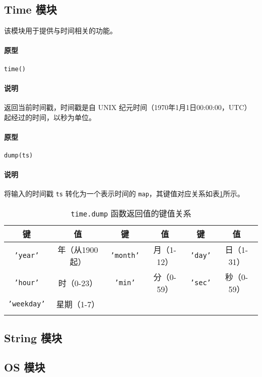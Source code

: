 \subsection{Time 模块}

该模块用于提供与时间相关的功能。


\paragraph{原型}
\begin{lstlisting}[language=berry, numbers=none]
time()
\end{lstlisting}

\paragraph{说明}
返回当前时间戳，时间戳是自 UNIX 纪元时间（1970年1月1日00:00:00，UTC）起经过的时间，以秒为单位。


\paragraph{原型}
\begin{lstlisting}[language=berry, numbers=none]
dump(ts)
\end{lstlisting}

\paragraph{说明}
将输入的时间戳 \texttt{ts} 转化为一个表示时间的 \texttt{map}，其键值对应关系如表\ref{tab::time_dump_map}所示。
\begin{table}[htb]
    \centering
    \setlength{\tabcolsep}{2mm}
    \begin{tabular}{cccccc} \Xhline{1pt}
        \textbf{键} & \textbf{值} & \textbf{键} & \textbf{值} & \textbf{键} & \textbf{值} \\ \hline
        \texttt{'year'} & 年（从1900起） & \texttt{'month'} & 月（1-12） & \texttt{'day'} & 日（1-31） \\
        \texttt{'hour'} & 时（0-23） & \texttt{'min'} & 分（0-59） & \texttt{'sec'} & 秒（0-59） \\
        \texttt{'weekday'} & 星期（1-7） \\
        \Xhline{1pt}
    \end{tabular}
    \caption{\texttt{time.dump} 函数返回值的键值关系}
    \label{tab::time_dump_map}
\end{table}

\subsection{String 模块}

\subsection{OS 模块}
